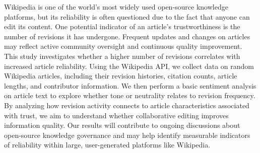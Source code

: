 
Wikipedia is one of the world’s most widely used open-source knowledge platforms, but its reliability is often questioned due to the fact that anyone can edit its content. 
One potential indicator of an article’s trustworthiness is the number of revisions it has undergone. Frequent updates and changes on articles may reflect active community 
oversight and continuous quality improvement. This study investigates whether a higher number of revisions correlates with increased article reliability. Using the Wikipedia
 API, we collect data on random Wikipedia articles, including their revision histories, citation counts, article lengths, and contributor information. We then perform a 
 basic sentiment analysis on article text to explore whether tone or neutrality relates to revision frequency. By analyzing how revision activity connects to article 
 characteristics associated with trust, we aim to understand whether collaborative editing improves information quality. Our results will contribute to ongoing discussions
  about open-source knowledge governance and may help identify measurable indicators of reliability within large, user-generated platforms like Wikipedia.

